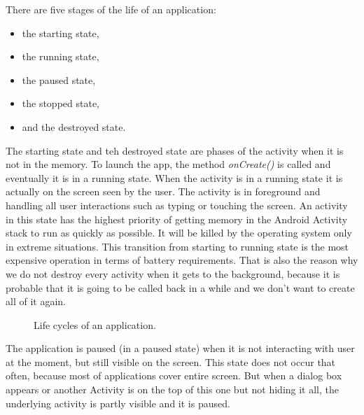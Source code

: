 There are five stages of the life of an application:
\begin{itemize}
\item the starting state,
\item the running state,
\item the paused state,
\item the stopped state,
\item and the destroyed state.
\end{itemize}

The starting state and teh destroyed state are phases of the activity when it is not in the memory.
To launch the app, the method \emph{onCreate()} is called and eventually it is in a running state.
When the activity is in a running state it is actually on the screen seen by the user.
The activity is in foreground and handling all user interactions such as typing or touching the screen.
An activity in this state has the highest priority of getting memory in the Android Activity stack to run as quickly as possible.
It will be killed by the operating system only in extreme situations.
This transition from starting to running state is the most expensive operation in terms of battery requirements.
That is also the reason why we do not destroy every activity when it gets to the background, 
because it is probable that it is going to be called back in a while and we don't want to create all of it again.

\begin{figure}[h!]
    \caption{Life cycles of an application.}
\end{figure}

The application is paused (in a paused state) when it is not interacting with user at the moment, but still visible on the screen.
This state does not occur that often, because most of applications cover entire screen.
But when a dialog box appears or another Activity is on the top of this one but not hiding it all, the underlying activity is partly visible and it is paused.

